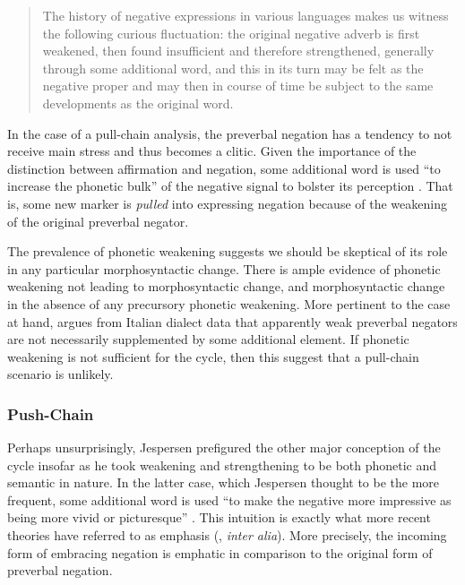 \documentclass[12pt]{article}
\theoremstyle{definition} \newtheorem{definition}{Definition}
\begin{document}
\begin{quotation}
The history of negative expressions in various languages makes us witness the following curious fluctuation: the original negative adverb is first weakened, then found insufficient and therefore strengthened, generally through some additional word, and this in its turn may be felt as the negative proper and may then in course of time be subject to the same developments as the original word. \citep[4]{jespersen:1917} 
\end{quotation}
In the case of a pull-chain analysis, the preverbal negation has a tendency to not receive main stress and thus becomes a clitic. Given the importance of the distinction between affirmation and negation, some additional word is used ``to increase the phonetic bulk'' of the negative signal to bolster its perception \citep[14]{jespersen:1917}. That is, some new marker is \emph{pulled} into expressing negation because of the weakening of the original preverbal negator.

The prevalence of phonetic weakening suggests we should be skeptical of its role in any particular morphosyntactic change. There is ample evidence of phonetic weakening not leading to morphosyntactic change, and morphosyntactic change in the absence of any precursory phonetic weakening. More pertinent to the case at hand, \cite{posner1985} argues from Italian dialect data that apparently weak preverbal negators are not necessarily supplemented by some additional element. If phonetic weakening is not sufficient for the cycle, then this suggest that a pull-chain scenario is unlikely.

\subsubsection{Push-Chain}

Perhaps unsurprisingly, Jespersen prefigured the other major conception of the cycle insofar as he took weakening and strengthening to be both phonetic and semantic in nature.  In the latter case, which Jespersen thought to be the more frequent, some additional word is used ``to make the negative more impressive as being more vivid or picturesque'' \citep[15]{jespersen:1917}. This intuition is exactly what more recent theories have referred to as emphasis (\citealt{detges-waltereit2002, hopper-traugottt2003, eckardt2006, kiparsky-condoravdi:2006}, \emph{inter alia}).  More precisely, the incoming form of embracing negation is emphatic in comparison to the original form of preverbal negation. 
\end{document}

